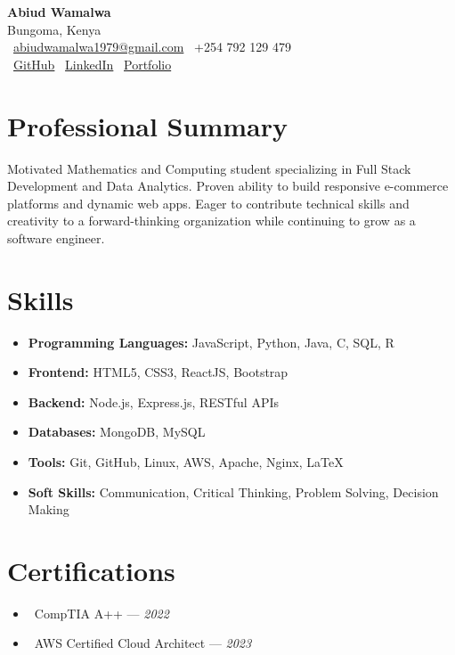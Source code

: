 \documentclass[a4paper,10pt]{article}
\begin{document}
\begin{center}
    {\Huge \textbf{Abiud Wamalwa}}\\
    Bungoma, Kenya \\
    \faEnvelope\ \href{mailto:abiudwamalwa1979@gmail.com}{abiudwamalwa1979@gmail.com} \quad
    \faPhone\ +254 792 129 479 \\
    \faGithub\ \href{https://github.com/waabiud}{GitHub} \quad
    \faLinkedin\ \href{https://linkedin.com/in/abiud-wamalwa}{LinkedIn} \quad
    \faGlobe\ \href{https://wamalwa.co.ke}{Portfolio}
\end{center}

\section*{Professional Summary}
Motivated Mathematics and Computing student specializing in Full Stack Development and Data Analytics. Proven ability to build responsive e-commerce platforms and dynamic web apps. Eager to contribute technical skills and creativity to a forward-thinking organization while continuing to grow as a software engineer.

\section*{Skills}
\begin{itemize}[leftmargin=*]
    \item \textbf{Programming Languages:} JavaScript, Python, Java, C, SQL, R
    \item \textbf{Frontend:} HTML5, CSS3, ReactJS, Bootstrap
    \item \textbf{Backend:} Node.js, Express.js, RESTful APIs
    \item \textbf{Databases:} MongoDB, MySQL
    \item \textbf{Tools:} Git, GitHub, Linux, AWS, Apache, Nginx, LaTeX
    \item \textbf{Soft Skills:} Communication, Critical Thinking, Problem Solving, Decision Making
\end{itemize}

\section*{Certifications}
\begin{itemize}[leftmargin=*]
    \item \faCheckCircle\ CompTIA A++ — \textit{2022}
    \item \faAws\ AWS Certified Cloud Architect — \textit{2023}
\end{itemize}
\end{document}
